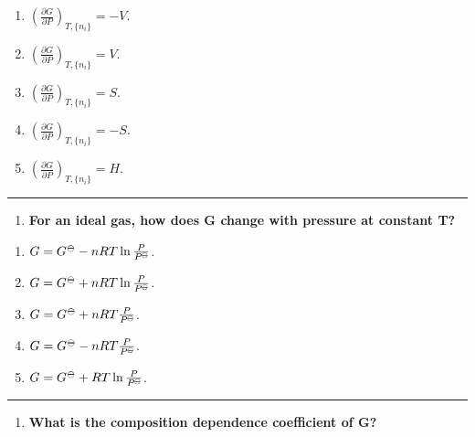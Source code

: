 \documentclass[
  9pt,
]{extbook}
\providecommand{\tightlist}{%
  \setlength{\itemsep}{0pt}\setlength{\parskip}{0pt}}
\theoremstyle{definition}
\theoremstyle{definition}
\theoremstyle{definition}
\theoremstyle{definition}
\theoremstyle{remark}
\begin{document}
\begin{enumerate}
\def\labelenumi{\alph{enumi}.}
\tightlist
\item
  \(\left(\frac{\partial G}{\partial P}\right)_{T,\{n_i\}} = -V\).
\item
  \(\left(\frac{\partial G}{\partial P}\right)_{T,\{n_i\}} = V\).
\item
  \(\left(\frac{\partial G}{\partial P}\right)_{T,\{n_i\}} = S\).
\item
  \(\left(\frac{\partial G}{\partial P}\right)_{T,\{n_i\}} = -S\).
\item
  \(\left(\frac{\partial G}{\partial P}\right)_{T,\{n_i\}} = H\).
\end{enumerate}

\begin{center}\rule{0.5\linewidth}{0.5pt}\end{center}

\begin{enumerate}
\def\labelenumi{\arabic{enumi}.}
\setcounter{enumi}{5}
\tightlist
\item
  \textbf{For an ideal gas, how does G change with pressure at constant T?}
\end{enumerate}

\begin{enumerate}
\def\labelenumi{\alph{enumi}.}
\tightlist
\item
  \(G = G^{{-\kern-6pt{\ominus}\kern-6pt-}} - nRT\ln\frac{P}{P^{{-\kern-6pt{\ominus}\kern-6pt-}}}\).
\item
  \(G = G^{{-\kern-6pt{\ominus}\kern-6pt-}} + nRT\ln\frac{P}{P^{{-\kern-6pt{\ominus}\kern-6pt-}}}\).
\item
  \(G = G^{{-\kern-6pt{\ominus}\kern-6pt-}} + nRT\frac{P}{P^{{-\kern-6pt{\ominus}\kern-6pt-}}}\).
\item
  \(G = G^{{-\kern-6pt{\ominus}\kern-6pt-}} - nRT\frac{P}{P^{{-\kern-6pt{\ominus}\kern-6pt-}}}\).
\item
  \(G = G^{{-\kern-6pt{\ominus}\kern-6pt-}} + RT\ln\frac{P}{P^{{-\kern-6pt{\ominus}\kern-6pt-}}}\).
\end{enumerate}

\begin{center}\rule{0.5\linewidth}{0.5pt}\end{center}

\begin{enumerate}
\def\labelenumi{\arabic{enumi}.}
\setcounter{enumi}{6}
\tightlist
\item
  \textbf{What is the composition dependence coefficient of G?}
\end{enumerate}
\end{document}
